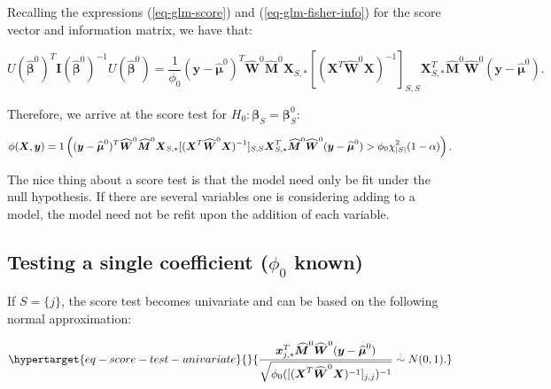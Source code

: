 \documentclass[
  11pt,
  letterpaper,
  oneside]{book}
\theoremstyle{plain}
\theoremstyle{plain}
\theoremstyle{definition}
\theoremstyle{definition}
\theoremstyle{plain}
\theoremstyle{remark}
\begin{document}
Recalling the expressions (\ref{eq-glm-score}) and
(\ref{eq-glm-fisher-info}) for the score vector and information matrix,
we have that:

\[
U(\boldsymbol{\widehat{\beta}}^0)^T \boldsymbol{I}(\boldsymbol{\widehat{\beta}}^0)^{-1} U(\boldsymbol{\widehat{\beta}}^0) = \frac{1}{\phi_0}(\boldsymbol{y} - \boldsymbol{\widehat{\mu}}^0)^T \boldsymbol{\widehat{W}}^0 \boldsymbol{\widehat{M}}^0 \boldsymbol{X}_{S,*}[(\boldsymbol{X}^T \boldsymbol{\widehat{W}}^0 \boldsymbol{X})^{-1}]_{S,S} \boldsymbol{X}_{S,*}^T \boldsymbol{\widehat{M}}^0 \boldsymbol{\widehat{W}}^0 (\boldsymbol{y} - \boldsymbol{\widehat{\mu}}^0).
\]

Therefore, we arrive at the score test for
\(H_0: \boldsymbol{\beta}_S = \boldsymbol{\beta}_S^0\):

\[
\small
\phi(\boldsymbol{X}, \boldsymbol{y}) = 1\left((\boldsymbol{y} - \boldsymbol{\widehat{\mu}}^0)^T \boldsymbol{\widehat{W}}^0 \boldsymbol{\widehat{M}}^0 \boldsymbol{X}_{S,*}[(\boldsymbol{X}^T \boldsymbol{\widehat{W}}^0 \boldsymbol{X})^{-1}]_{S,S} \boldsymbol{X}_{S,*}^T \boldsymbol{\widehat{M}}^0 \boldsymbol{\widehat{W}}^0 (\boldsymbol{y} - \boldsymbol{\widehat{\mu}}^0) > \phi_0 \chi^2_{|S|}(1-\alpha)\right).
\]

The nice thing about a score test is that the model need only be fit
under the null hypothesis. If there are several variables one is
considering adding to a model, the model need not be refit upon the
addition of each variable.

\hypertarget{sec-score-test-single-coeff}{%
\subsection{\texorpdfstring{Testing a single coefficient (\(\phi_0\)
known)}{Testing a single coefficient (\textbackslash phi\_0 known)}}\label{sec-score-test-single-coeff}}

If \(S = \{j\}\), the score test becomes univariate and can be based on
the following normal approximation:

\begin{equation}\protect\hypertarget{eq-score-test-univariate}{}{
\frac{\boldsymbol{x}_{j,*}^T \boldsymbol{\widehat{M}}^0 \boldsymbol{\widehat{W}}^0 (\boldsymbol{y} - \boldsymbol{\widehat{\mu}}^0)}{\sqrt{\phi_0 ([(\boldsymbol{X}^T \boldsymbol{\widehat{W}}^0 \boldsymbol{X})^{-1}]_{j, j})^{-1}}} \overset{\cdot}{\sim} N(0, 1).
}\label{eq-score-test-univariate}\end{equation}
\end{document}
